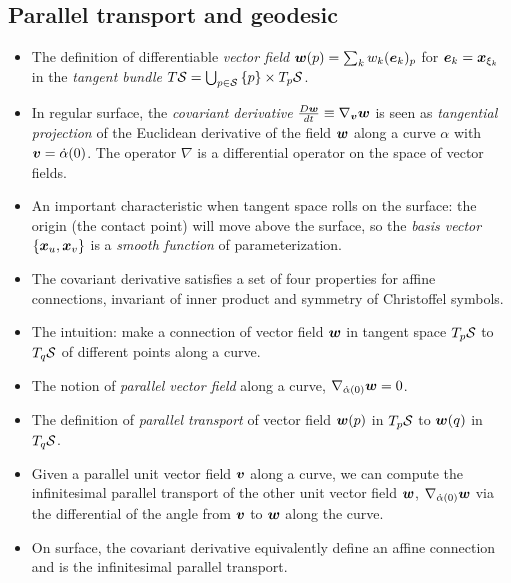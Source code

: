 \documentclass[11pt]{article}
\begin{document}
\subsection{Parallel transport and geodesic}
\begin{itemize}
\item The definition of differentiable \emph{vector field} $\boldsymbol{w}(p) = \sum_{k}w_{k}(\boldsymbol{e}_{k})_{p}$ for $\boldsymbol{e}_{k} = \boldsymbol{x}_{\xi_{k}}$ in the \emph{tangent bundle} $T{\mathcal S}  = \bigcup_{p\in {\mathcal S}}\left\{p\right\}\times T_{p}{\mathcal S}$. 

\item In regular surface, the \emph{covariant derivative} $\frac{D\boldsymbol{w}}{dt}\equiv \nabla_{\boldsymbol{v}}\boldsymbol{w}$ is seen as \emph{tangential projection} of the Euclidean derivative of the field $\boldsymbol{w}$ along a curve $\alpha$ with $\boldsymbol{v} = \dot{\alpha}(0)$. The operator $\nabla$ is a differential operator on the space of vector fields. 

\item An important characteristic when tangent space rolls on the surface: the origin (the contact point) will move above the surface, so the\emph{ basis vector} $\left\{\boldsymbol{x}_{u}, \boldsymbol{x}_{v}\right\}$ is a \emph{smooth function} of parameterization.

\item The covariant derivative satisfies a set of four properties for affine connections, invariant of inner product and symmetry of Christoffel symbols.

\item The intuition: make a connection of vector field $\boldsymbol{w}$ in tangent space $T_{p}{\mathcal S}$ to $T_{q}{\mathcal S}$ of different points along a curve. \\[5pt]

\item The notion of \emph{parallel vector field} along a curve, $\nabla_{\dot{\alpha}(0)}\boldsymbol{w} = 0$.

\item The definition of \emph{parallel transport} of vector field $\boldsymbol{w}(p)$ in $T_{p}{\mathcal S}$ to $\boldsymbol{w}(q)$ in $T_{q}{\mathcal S}$.

\item Given a parallel unit vector field $\boldsymbol{v}$ along a curve, we can compute the infinitesimal parallel transport of the other unit vector field $\boldsymbol{w}$, $\nabla_{\dot{\alpha}(0)}\boldsymbol{w}$ via the differential of the angle from $\boldsymbol{v}$ to $\boldsymbol{w}$ along the curve. 


\item On surface, the covariant derivative equivalently define an affine connection and is the infinitesimal parallel transport.


\end{itemize}
\end{document}
